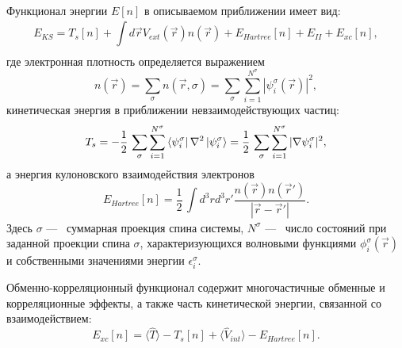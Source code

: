 Функционал энергии $E[n]$ в описываемом приближении имеет вид:
\begin{equation}
    \label{eq:dft:E_KS-def}
    E_{KS} = T_{s} [n] + \int\limits_{}^{} d \vec{r} V_{ext} (\vec{r}) n(\vec{r}) + E_{Hartree} [n] + E_{II}  + E_{xc} [n],  
\end{equation}
где электронная плотность определяется выражением
\begin{equation}
    \label{eq:dft:density-kohn}
    n (\vec{r}) = \sum\limits_{\sigma}^{} n(\vec{r}, \sigma) = \sum\limits_{\sigma}^{} \sum\limits_{i=1}^{N^{\sigma} } |\psi_i^{\sigma} (\vec{r})|^2, 
\end{equation}
кинетическая энергия в приближении невзаимодействующих частиц:
\begin{equation}
     \label{eq:dft:T_s-def}
     T_{s}  = - \frac{1}{2}\, \sum\limits_{\sigma}^{}\sum\limits_{i=1}^{N^{\sigma}} \bra{\psi_i^{\sigma} } \nabla^2 \ket{\psi_i^{\sigma}} 
      = \frac{1}{2}\, \sum\limits_{\sigma}^{} \sum\limits_{i=1}^{N^{\sigma} } |\nabla \psi_i^{\sigma} |^2,
 \end{equation}
 а энергия кулоновского взаимодействия электронов
 \begin{equation}
     \label{eq:dft:E_Hartree-def}
     E_{Hartree} [n] = \frac{1}{2}\, \int\limits_{}^{}d^3 r d^3 r' \frac{n(\vec{r}) n(\vec{r}')}{|\vec{r} - \vec{r}'|}.
 \end{equation}
Здесь $\sigma$ ---~ суммарная проекция спина системы, $N^{\sigma} $ ---~ число состояний при заданной проекции спина $\sigma$, характеризующихся волновыми функциями $\phi_i^{\sigma} (\vec{r})$ и собственными значениями энергии $\epsilon_i^{\sigma}$.

Обменно-корреляционный функционал содержит многочастичные обменные и корреляционные эффекты, а также часть кинетической энергии, связанной со взаимодействием:
\begin{equation}
    \label{eq:dft:E_xc-def}
    E_{xc} [n] = \langle \hat{T} \rangle - T_s [n] + \langle \hat{V}_{int} \rangle - E_{Hartree} [n].
\end{equation}

